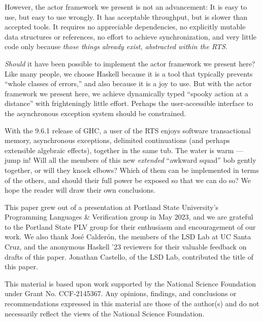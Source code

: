 \documentclass[sigplan,screen]{acmart}
\begin{document}
However, the actor framework we present is not an advancement:
%
It is easy to use, but easy to use wrongly.
%
It has acceptable throughput, but is slower than accepted
tools.
%
It requires no appreciable dependencies, no explicitly mutable data structures
or references, no effort to achieve synchronization, and very little code only
because \emph{those things already exist, abstracted within the RTS}.


\emph{Should} it have been possible to implement the actor framework we present
here?
%
Like many people, we choose Haskell because it is a tool that typically
prevents ``whole classes of errors,'' and also because it is a joy to use.
%
But with the actor framework we present here,
we achieve dynamically typed ``spooky action at a distance''
with frighteningly little effort.
%
Perhaps the user-accessible interface to the asynchronous exception system
should be constrained.

With the 9.6.1 release of GHC,
a user of the RTS enjoys
software transactional memory,
asynchronous exceptions,
delimited continuations (and perhaps extensible algebraic effects),
together in the same tub.
%
The water is warm --- jump in!
%
Will all the members of this new \emph{extended} ``awkward squad''
\cite{peytonjones2001tackling} bob gently together, or will they knock elbows?
%
Which of them can be implemented in terms of the
others, and should their full power be exposed so that we can do so?
%
We hope the reader will draw their own conclusions.









\begin{acks}
This paper grew out of a presentation at Portland State University's Programming Languages \& Verification group in May 2023, and we are grateful to the Portland State PLV group for their enthusiasm and encouragement of our work.
%
We also thank Jos\'{e} Calder\'{o}n, the members of the LSD Lab at UC Santa Cruz, and the anonymous Haskell '23 reviewers for their valuable feedback on drafts of this paper.
Jonathan Castello, of the LSD Lab, contributed the title of this paper.

This material is based upon work supported by the National Science Foundation under Grant No. CCF-2145367. Any opinions, findings, and conclusions or recommendations expressed in this material are those of the author(s) and do not necessarily reflect the views of the National Science Foundation.
\end{acks}
\end{document}
